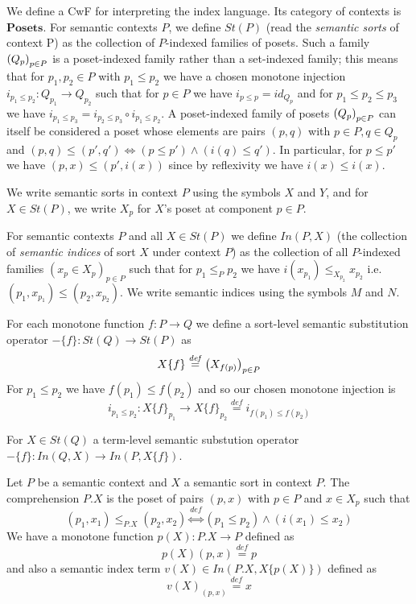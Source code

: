 \documentclass{article}
\newcommand{\mbf}{\mathbf}
\newcommand{\defeq}{\overset{\mathit{def}}{=}}
\newcommand{\defequiv}{\overset{\mathit{def}}{\Leftrightarrow}}
\newcommand{\fm}[2]{
\left(
\tiny
#1
\normalsize
\right)_{#2}
}
\begin{document}
We define a CwF for interpreting the index language. Its category of contexts is $\mbf{Posets}$. For semantic contexts $P$, we define $\mathit{St}(P)$ (read the \emph{semantic sorts} of context P) as the collection of $P$-indexed families of posets. Such a family $\fm{Q_p}{p \in P}$ is a poset-indexed family rather than a set-indexed family; this means that for $p_1,p_2 \in P$ with $p_1 \leq p_2$ we have a chosen monotone injection $i_{p_1 \leq p_2} : Q_{p_1} \to Q_{p_2}$ such that for $p \in P$ we have $i_{p \leq p} = \mathit{id}_{Q_p}$ and for $p_1 \leq p_2 \leq p_3$ we have $i_{p_1 \leq p_3} = i_{p_2 \leq p_3} \circ i_{p_1 \leq p_2}$.
A poset-indexed family of posets $\fm{Q_p}{p \in P}$ can itself be considered a poset whose elements are pairs $(p,q)$ with $p \in P, q \in Q_p$ and $(p,q) \leq (p',q') \Leftrightarrow (p \leq p') \wedge (i(q) \leq q')$. In particular, for $p \leq p'$ we have $(p, x) \leq (p', i(x))$ since by reflexivity we have $i(x) \leq i(x)$.

 We write semantic sorts in context $P$ using the symbols $X$ and $Y$, and for $X \in \mathit{St}(P)$, we write $X_p$ for $X$'s poset at component $p \in P$. 

For semantic contexts $P$ and all $X \in \mathit{St}(P)$ we define $\mathit{In}(P, X)$ (the collection of \emph{semantic indices} of sort $X$ under context $P$) as the collection of all $P$-indexed families $(x_p \in X_p)_{p \in P}$ such that for $p_1 \leq_P p_2$ we have $i(x_{p_1}) \leq_{X_{p_2}} x_{p_2}$ i.e. $(p_1, x_{p_1}) \leq (p_2, x_{p_2})$. We write semantic indices using the symbols $M$ and $N$.

For each monotone function $f : P \to Q$ we define a sort-level semantic substitution operator $- \{ f \} : \mathit{St}(Q) \to \mathit{St}(P)$ as 
$$X \{ f \} \defeq \fm{X_{f(p)}}{p \in P}$$
For $p_1 \leq p_2$ we have $f(p_1) \leq f(p_2)$ and so our chosen monotone injection is 
$$i_{p_1 \leq p_2} : X\{ f \}_{p_1} \to X \{ f \}_{p_2} \defeq i_{f(p_1) \leq f(p_2)}$$

For $X \in \mathit{St}(Q)$ a term-level semantic substution operator $- \{ f \} : \mathit{In}(Q,X) \to \mathit{In}(P, X \{ f \})$.

Let $P$ be a semantic context and $X$ a semantic sort in context $P$. The comprehension $P . X$ is the poset of pairs $(p,x)$ with $p \in P$ and $x \in X_p$ such that 
$$(p_1,x_1) \leq_{P.X} (p_2,x_2) \defequiv (p_1 \leq p_2) \wedge (i(x_1) \leq x_2)$$
We have a monotone function $p(X) : P . X \to P$ defined as 
$$p(X)(p,x) \defeq p$$
and also a semantic index term $v(X) \in \mathit{In}(P.X, X \{ p(X) \})$ defined as
$$v(X)_{(p,x)} \defeq x$$
\end{document}
